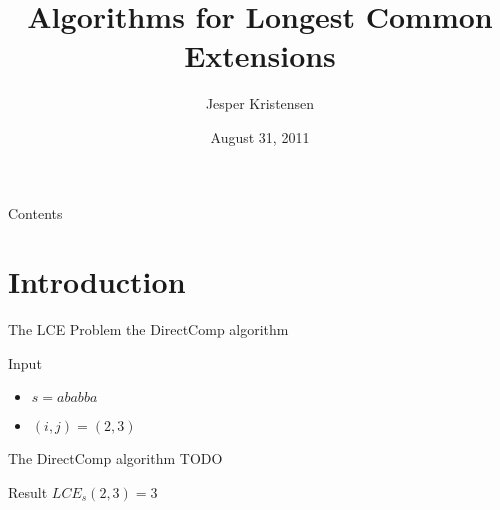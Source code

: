 \documentclass{beamer}
\title{Algorithms for Longest Common Extensions}
\author{Jesper Kristensen}
\institute[DTU Informatics]{DTU Informatics\\Technical University of Denmark}
\date{August 31, 2011}
\begin{document}
\begin{frame}
\titlepage
\end{frame}

\begin{frame}{Contents}
\tableofcontents
\end{frame}

\section{Introduction}
\begin{frame}{The LCE Problem the DirectComp algorithm}
    \begin{block}{Input}
        \begin{itemize}
            \item $s=ababba$
            \item $(i,j)=(2,3)$
        \end{itemize}
    \end{block}
    \begin{block}{The DirectComp algorithm}
        TODO
    \end{block}
    \begin{block}{Result}
        $LCE_s(2,3)=3$
    \end{block}
\end{frame}
\end{document}
